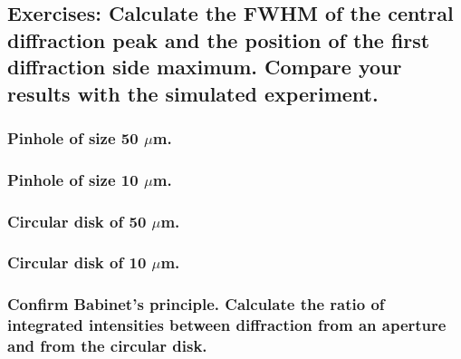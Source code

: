     \hypertarget{exercises-calculate-the-fwhm-of-the-central-diffraction-peak-and-the-position-of-the-first-diffraction-side-maximum.-compare-your-results-with-the-simulated-experiment.}{%
\subsection{Exercises: Calculate the FWHM of the central diffraction
peak and the position of the first diffraction side maximum. Compare
your results with the simulated
experiment.}\label{exercises-calculate-the-fwhm-of-the-central-diffraction-peak-and-the-position-of-the-first-diffraction-side-maximum.-compare-your-results-with-the-simulated-experiment.}}

\hypertarget{pinhole-of-size-50-mum.}{%
\subsubsection{\texorpdfstring{Pinhole of size 50
\(\mu\)m.}{Pinhole of size 50 \textbackslash mum.}}\label{pinhole-of-size-50-mum.}}

\hypertarget{pinhole-of-size-10-mum.}{%
\subsubsection{\texorpdfstring{Pinhole of size 10
\(\mu\)m.}{Pinhole of size 10 \textbackslash mum.}}\label{pinhole-of-size-10-mum.}}

\hypertarget{circular-disk-of-50-mum.}{%
\subsubsection{\texorpdfstring{Circular disk of 50
\(\mu\)m.}{Circular disk of 50 \textbackslash mum.}}\label{circular-disk-of-50-mum.}}

\hypertarget{circular-disk-of-10-mum.}{%
\subsubsection{\texorpdfstring{Circular disk of 10
\(\mu\)m.}{Circular disk of 10 \textbackslash mum.}}\label{circular-disk-of-10-mum.}}

\hypertarget{confirm-babinets-principle.-calculate-the-ratio-of-integrated-intensities-between-diffraction-from-an-aperture-and-from-the-circular-disk.}{%
\subsubsection{Confirm Babinet's principle. Calculate the ratio of
integrated intensities between diffraction from an aperture and from the
circular
disk.}\label{confirm-babinets-principle.-calculate-the-ratio-of-integrated-intensities-between-diffraction-from-an-aperture-and-from-the-circular-disk.}}

    \begin{tcolorbox}[breakable, size=fbox, boxrule=1pt, pad at break*=1mm,colback=cellbackground, colframe=cellborder]
\begin{Verbatim}[commandchars=\\\{\}]

\end{Verbatim}
\end{tcolorbox}


    
    
    
